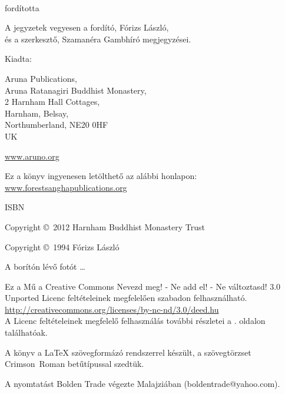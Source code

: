 {\small\setlength{\parskip}{0.8em}\setlength{\parindent}{0em}%
{\raggedright%

\thetitle\\
fordította \theauthor

A jegyzetek vegyesen a fordító, Fórizs László,\\
és a szerkesztő, Szamanéra Gambhíró megjegyzései.

Kiadta:

Aruna Publications,\\
Aruna Ratanagiri Buddhist Monastery,\\
2 Harnham Hall Cottages,\\
Harnham, Belsay,\\
Northumberland, NE20 0HF\\
UK

\href{http://aruno.org}{www.aruno.org}

Ez a könyv ingyenesen letölthető az alábbi honlapon:\\
\href{http://forestsanghapublications.org/}{www.forestsanghapublications.org}

ISBN \theISBN

Copyright \copyright\ 2012 Harnham Buddhist Monastery Trust

Copyright \copyright\ 1994 Fórizs László

A borítón lévő fotót \ldots

\vfill

{\footnotesize

Ez a Mű a Creative Commons Nevezd meg! - Ne add el! - Ne változtasd! 3.0 Unported Licenc feltételeinek megfelelően szabadon felhasználható.\\
\href{http://creativecommons.org/licenses/by-nc-nd/3.0/deed.hu}{http://creativecommons.org/licenses/by-nc-nd/3.0/deed.hu}\\

A Licenc feltételeinek megfelelő felhasználás további részletei a \pageref{copyright-details}. oldalon találhatóak.

A könyv a {\selectfont\LaTeX} szövegformázó rendszerrel készült, a szövegtörzset Crimson~Roman betűtípussal szedtük.

\theEditionInfo

A nyomtatást Bolden Trade végezte Malajziában (boldentrade@yahoo.com).

}

}}


